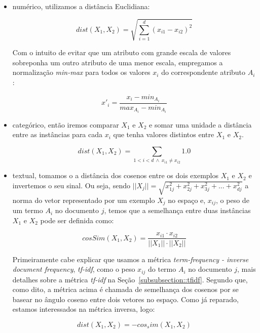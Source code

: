 \begin{itemize}

\item numérico, utilizamos a distância Euclidiana:

\begin{equation}\label{eqn::distancia_euclidiana}
    dist(X_1, X_2) =  \sqrt{\sum_{i=1}^d (x_{i1}-x_{i2})^2}
\end{equation}

    Com o intuito de evitar que um atributo com grande escala de valores sobreponha um outro atributo de uma menor escala, empregamos a normalização \textit{min-max} para todos os valores $x_i$ do correspondente atributo $A_i$: 

\begin{equation}\label{eqn::distancia_euclidiana}
    x'_{i} =  \frac{x_{i} - min_{A_i}}{ max_{A_i} - min_{A_i} }
\end{equation}

\item categórico, então iremos comparar $X_1$ e $X_2$ e somar uma unidade a distância entre as instâncias para cada $x_i$ que tenha valores distintos entre $X_1$ e $X_2$.

\begin{equation}\label{eqn::distancia_cat}
   dist(X_1, X_2) = \sum_{1 < i < d \ \wedge \ x_{i1} \neq x_{i2}} 1.0
\end{equation}

\item textual, tomamos o a distância dos cosenos entre os dois exemplos $X_1$ e $X_2$ e invertemos o seu sinal. Ou seja, sendo $||X_j|| = \sqrt{x_{1j}^2 + x_{2j}^2 + x_{3j}^2 + ... + x_{dj}^2}$ a norma do vetor representado por um exemplo $X_j$ no espaço e, $x_{ij}$, o peso de um termo $A_i$ no documento $j$, temos que a semelhança entre duas instâncias $X_1$ e $X_2$ pode ser definida como:

\begin{equation}\label{eqn::distancia_texto}
    cosSim(X_1, X_2) = \frac{  x_{i1} \cdot x_{i2} }{ ||X_1|| \cdot ||X_2|| }
\end{equation}

Primeiramente cabe explicar que usamos a métrica \textit{term-frequency - inverse document frequency}, \textit{tf-idf}, como o peso $x_{ij}$ do termo $A_i$ no documento $j$, mais detalhes sobre a métrica \textit{tf-idf} na Seção~\ref{subsubsection::tfidf}. Segundo que, como dito, a métrica acima é chamada de semelhança dos cosenos por se basear no ângulo coseno entre dois vetores no espaço. Como já reparado, estamos interessados na métrica inversa, logo:
 
 \begin{equation}\label{eqn::distancia_texto}
    dist(X_1, X_2) = - cos_sim(X_1, X_2)
\end{equation}


\end{itemize}

